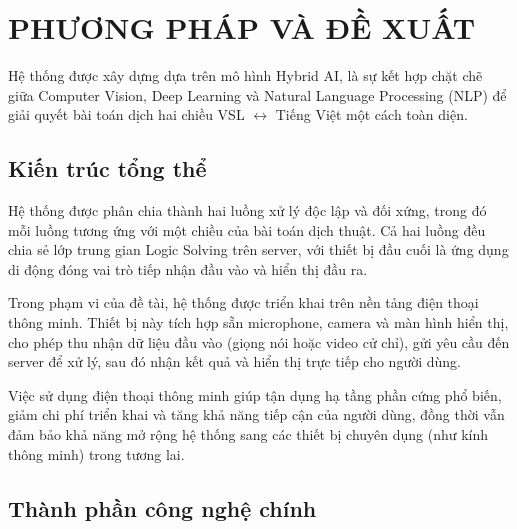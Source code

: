 \chapter{PHƯƠNG PHÁP VÀ ĐỀ XUẤT}
 
Hệ thống được xây dựng dựa trên mô hình Hybrid AI, là sự kết hợp chặt chẽ giữa Computer Vision, Deep Learning và Natural Language Processing (NLP) để giải quyết bài toán dịch hai chiều VSL $\leftrightarrow$ Tiếng Việt một cách toàn diện.
 
\section{Kiến trúc tổng thể}
 
Hệ thống được phân chia thành hai luồng xử lý độc lập và đối xứng, trong đó mỗi luồng tương ứng với một chiều của bài toán dịch thuật. Cả hai luồng đều chia sẻ lớp trung gian Logic Solving trên server, với thiết bị đầu cuối là ứng dụng di động đóng vai trò tiếp nhận đầu vào và hiển thị đầu ra.

Trong phạm vi của đề tài, hệ thống được triển khai trên nền tảng điện thoại thông minh. Thiết bị này tích hợp sẵn microphone, camera và màn hình hiển thị, cho phép thu nhận dữ liệu đầu vào (giọng nói hoặc video cử chỉ), gửi yêu cầu đến server để xử lý, sau đó nhận kết quả và hiển thị trực tiếp cho người dùng.

Việc sử dụng điện thoại thông minh giúp tận dụng hạ tầng phần cứng phổ biến, giảm chi phí triển khai và tăng khả năng tiếp cận của người dùng, đồng thời vẫn đảm bảo khả năng mở rộng hệ thống sang các thiết bị chuyên dụng (như kính thông minh) trong tương lai.

\section{Thành phần công nghệ chính}
 
